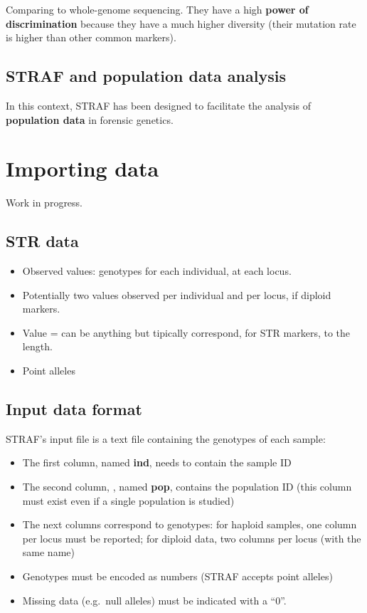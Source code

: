 \documentclass[
]{book}
\providecommand{\tightlist}{%
  \setlength{\itemsep}{0pt}\setlength{\parskip}{0pt}}
\begin{document}
Comparing to whole-genome sequencing. They have a high \textbf{power of discrimination}
because they have a much higher diversity (their mutation rate is higher than
other common markers).

\hypertarget{straf-and-population-data-analysis}{%
\section*{STRAF and population data analysis}\label{straf-and-population-data-analysis}}

In this context, STRAF has been designed to facilitate the analysis of
\textbf{population data} in forensic genetics.

\hypertarget{importing-data}{%
\chapter{Importing data}\label{importing-data}}

Work in progress.

\hypertarget{str-data}{%
\section{STR data}\label{str-data}}

\begin{itemize}
\tightlist
\item
  Observed values: genotypes for each individual, at each locus.
\item
  Potentially two values observed per individual and per locus, if diploid markers.
\item
  Value = can be anything but tipically correspond, for STR markers, to the length.
\item
  Point alleles
\end{itemize}

\hypertarget{input-data-format}{%
\section{Input data format}\label{input-data-format}}

STRAF's input file is a text file containing the genotypes of each sample:

\begin{itemize}
\tightlist
\item
  The first column, named \textbf{ind}, needs to contain the sample ID
\item
  The second column, , named \textbf{pop}, contains the population ID (this column must exist even if a single population is studied)
\item
  The next columns correspond to genotypes: for haploid samples, one column per locus must be reported; for diploid data, two columns per locus (with the same name)
\item
  Genotypes must be encoded as numbers (STRAF accepts point alleles)
\item
  Missing data (e.g.~null alleles) must be indicated with a ``0''.
\end{itemize}
\end{document}
